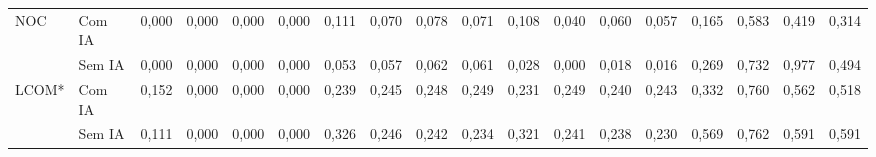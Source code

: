 \begin{table}[htbp]
{\begin{tabular}{ll|rrrr|rrrr|rrrr|rrrr}
NOC & Com IA & 0,000 & 0,000 & 0,000 & 0,000 & 0,111 & 0,070 & 0,078 & 0,071 & 0,108 & 0,040 & 0,060 & 0,057 & 0,165 & 0,583 & 0,419 & 0,314 \\
 & Sem IA & 0,000 & 0,000 & 0,000 & 0,000 & 0,053 & 0,057 & 0,062 & 0,061 & 0,028 & 0,000 & 0,018 & 0,016 & 0,269 & 0,732 & 0,977 & 0,494 \\[3pt]
LCOM* & Com IA & 0,152 & 0,000 & 0,000 & 0,000 & 0,239 & 0,245 & 0,248 & 0,249 & 0,231 & 0,249 & 0,240 & 0,243 & 0,332 & 0,760 & 0,562 & 0,518 \\
 & Sem IA & 0,111 & 0,000 & 0,000 & 0,000 & 0,326 & 0,246 & 0,242 & 0,234 & 0,321 & 0,241 & 0,238 & 0,230 & 0,569 & 0,762 & 0,591 & 0,591 \\
\hline
\end{tabular}}
\par\vspace{2pt}{\footnotesize Nota: estatísticas entre repositórios; cada repositório é representado pela média de suas classes. NOC igual a zero indica repositório sem subclasses entre suas próprias classes. E1 foi medida apenas nos repositórios criados até 2013 (9 com IA e 11 sem IA).}
\end{table}
